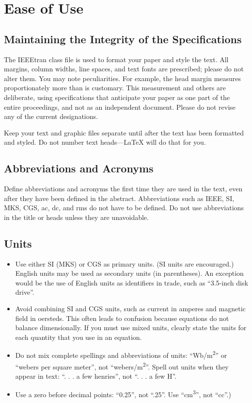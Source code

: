 \documentclass[conference]{IEEEtran}
\begin{document}
\section{Ease of Use}

\subsection{Maintaining the Integrity of the Specifications}

The IEEEtran class file is used to format your paper and style the text. All margins, 
column widths, line spaces, and text fonts are prescribed; please do not 
alter them. You may note peculiarities. For example, the head margin
measures proportionately more than is customary. This measurement 
and others are deliberate, using specifications that anticipate your paper 
as one part of the entire proceedings, and not as an independent document. 
Please do not revise any of the current designations.

Keep your text and graphic files separate until after the text has been 
formatted and styled. Do not number text heads---{\LaTeX} will do that 
for you.

\subsection{Abbreviations and Acronyms}\label{AA}
Define abbreviations and acronyms the first time they are used in the text, 
even after they have been defined in the abstract. Abbreviations such as 
IEEE, SI, MKS, CGS, ac, dc, and rms do not have to be defined. Do not use 
abbreviations in the title or heads unless they are unavoidable.

\subsection{Units}
\begin{itemize}
\item Use either SI (MKS) or CGS as primary units. (SI units are encouraged.) English units may be used as secondary units (in parentheses). An exception would be the use of English units as identifiers in trade, such as ``3.5-inch disk drive''.
\item Avoid combining SI and CGS units, such as current in amperes and magnetic field in oersteds. This often leads to confusion because equations do not balance dimensionally. If you must use mixed units, clearly state the units for each quantity that you use in an equation.
\item Do not mix complete spellings and abbreviations of units: ``Wb/m\textsuperscript{2}'' or ``webers per square meter'', not ``webers/m\textsuperscript{2}''. Spell out units when they appear in text: ``. . . a few henries'', not ``. . . a few H''.
\item Use a zero before decimal points: ``0.25'', not ``.25''. Use ``cm\textsuperscript{3}'', not ``cc''.)
\end{itemize}
\end{document}
